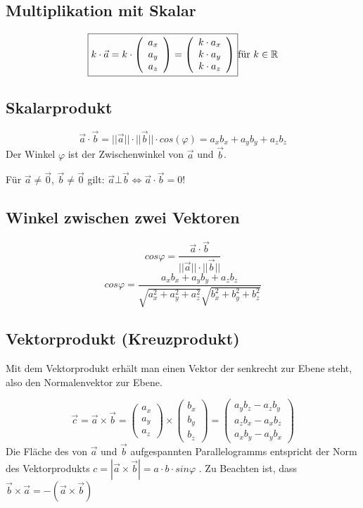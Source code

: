 \subsection{Multiplikation mit Skalar}
\[ \boxed{ k \cdot \vec{a} = k \cdot 
\left( 
	  \begin{array}{ccc} 
	    a_x \\ a_y \\ a_z
	  \end{array}
	\right)
	=
	\left( 
	  \begin{array}{ccc} 
	    k \cdot a_x \\ k \cdot a_y \\ k \cdot a_z
	  \end{array}
	\right)
	} \\ \text{für } k \in \mathbb{R}
\]

\subsection{Skalarprodukt}
\[ \boxed{ \vec{a} \cdot \vec{b} = ||\vec{a}|| \cdot ||\vec{b}|| \cdot cos(\varphi) = a_x b_x + a_y b_y + a_z b_z } \]
Der Winkel $\varphi$ ist der Zwischenwinkel von $\vec{a}$ und $\vec{b}$.

\noindent
Für $\vec{a} \neq \vec{0}$, $\vec{b} \neq \vec{0}$ gilt: $\vec{a} \bot \vec{b} \Leftrightarrow \vec{a} \cdot \vec{b} = 0$!

\subsection{Winkel zwischen zwei Vektoren}
\[ \boxed{ cos \varphi = \frac{\vec{a} \cdot \vec{b} }{||\vec{a}|| \cdot ||\vec{b}||} } \]
\[ \boxed{ cos \varphi = \frac{a_x b_x + a_y b_y + a_z b_z}{ \sqrt{a_x^2 + a_y^2 + a_z^2} \sqrt{b_x^2 + b_y^2 + b_z^2} } } \]

\subsection{Vektorprodukt (Kreuzprodukt)}
Mit dem Vektorprodukt erhält man einen Vektor der senkrecht zur Ebene steht, also den Normalenvektor zur Ebene.

\[ \boxed{ \vec{c} = \vec{a} \times \vec{b} = 
\left( 
	  \begin{array}{ccc} 
	    a_x \\ a_y \\ a_z
	  \end{array}
	\right)
	\times
	\left( 
	  \begin{array}{ccc} 
	    b_x \\ b_y \\ b_z
	  \end{array}
	\right)
	=
	\left( 
	  \begin{array}{ccc} 
	    a_y b_z - a_z b_y \\ a_z b_x - a_x b_z \\ a_x b_y - a_y b_x
	  \end{array}
	\right)
} \]
\noindent
Die Fläche des von $\vec{a}$ und $\vec{b}$ aufgespannten Parallelogramms entspricht der Norm des Vektorprodukts $c=|\vec{a}\times\vec{b}| = a \cdot b \cdot sin \varphi$ .
Zu Beachten ist, dass $\vec{b} \times \vec{a} = -(\vec{a} \times \vec{b}) $

